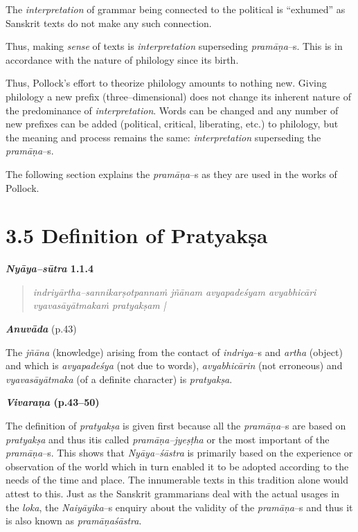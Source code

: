  \item The \textit{interpretation} of grammar being connected to the political is “exhumed” as Sanskrit texts do not make any such connection.

 \item Thus, making \textit{sense} of texts is \textit{interpretation} superseding \textit{pramāṇa}–s. This is in accordance with the nature of philology since its birth.

Thus, Pollock’s effort to theorize philology amounts to nothing new. Giving philology a new prefix (three–dimensional) does not change its inherent nature of the predominance of \textit{interpretation}. Words can be changed and any number of new prefixes can be added (political, critical, liberating, etc.) to philology, but the meaning and process remains the same: \textit{interpretation} superseding the \textit{pramāṇa}–s.

The following section explains the \textit{pramāṇa}–s as they are used in the works of Pollock.


\section*{3.5 Definition of Pratyakṣa}

\textbf{\textit{Nyāya–sūtra} 1.1.4}

\begin{verse}
\textit{indriyārtha–sannikarṣotpannaṁ jñānam avyapadeśyam avyabhicāri vyavasāyātmakaṁ pratyakṣam |}
\end{verse}

\textit{\textbf{Anuvāda }}(p.43)

The \textit{jñāna} (knowledge) arising from the contact of \textit{indriya}–s and \textit{artha} (object) and which is \textit{avyapadeśya }(not due to words), \textit{avyabhicārin }(not erroneous) and \textit{vyavasāyātmaka }(of a definite character) is \textit{pratyakṣa}.

\textbf{\textit{Vivaraṇa} (p.43–50)}

The definition of \textit{pratyakṣa }is given first because all the \textit{pramāṇa}–s are based on \textit{pratyakṣa }and thus itis called \textit{pramāṇa–jyeṣṭha} or the most important of the \textit{pramāṇa}–s. This shows that \textit{Nyāya–śāstra} is primarily based on the experience or observation of the world which in turn enabled it to be adopted according to the needs of the time and place. The innumerable texts in this tradition alone would attest to this. Just as the Sanskrit grammarians deal with the actual usages in the \textit{loka}, the \textit{Naiyāyika}–s enquiry about the validity of the \textit{pramāṇa}–s and thus it is also known as \textit{pramāṇaśāstra}.

